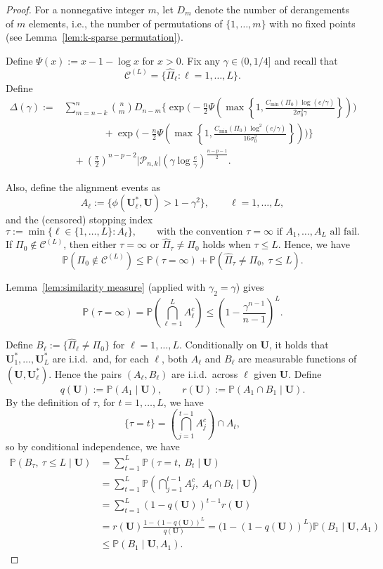 \documentclass[11pt, reqno]{amsart}
\newcommand{\bP}{\mathbb{P}}
\renewcommand{\hat}{\widehat}
\renewcommand{\le}{\leqslant}
\newcommand{\mC}{\mathcal{C}}
\newcommand{\mP}{\mathcal{P}}
\newcommand{\1}{\mbox{1}\hspace{-0.25em}\mbox{l}}
\theoremstyle{definition}\newtheorem{problem}{Problem}[section]
\theoremstyle{definition}\newtheorem{definition}[problem]{Definition}
\theoremstyle{remark}\newtheorem{assumption}{Assumption}
\theoremstyle{remark}\newtheorem{remark}[problem]{Remark}
\theoremstyle{definition}\newtheorem{example}[problem]{Example}
\theoremstyle{plain}\newtheorem{theorem}[problem]{Theorem}
\theoremstyle{plain}\newtheorem{question}[problem]{Question}
\theoremstyle{plain}\newtheorem{lemma}[problem]{Lemma}
\theoremstyle{plain}\newtheorem{proposition}[problem]{Proposition}
\theoremstyle{plain}\newtheorem{corollary}[problem]{Corollary}
\theoremstyle{plain}\newtheorem{conjecture}[problem]{Conjecture}
\begin{document}
\begin{proof}
For a nonnegative integer $m$, let $D_m$ denote the number of derangements of $m$ elements, i.e.,
the number of permutations of $\{1,\dots,m\}$ with no fixed points (see Lemma~\ref{lem:k-sparse permutation}).

Define $\Psi(x):=x-1-\log x$ for $x>0$. Fix any $\gamma\in(0,1/4]$ and recall that
\[
\mC^{(L)}=\{\hat\Pi_\ell:\ell=1,\dots,L\}.
\]
Define
\begin{align}
\label{eq:Delta-gamma}
\Delta(\gamma)
:=
&\sum_{m=n-k}^n\binom{n}{m}D_{n-m}
\Bigg\{
\exp\Bigg(
-\frac{n}{2}\Psi\left(
\max\left\{1,
\frac{C_{\min}(\Pi_0)\log(e/\gamma)}{2\sigma_0^2\gamma}
\right\}
\right)
\Bigg)
\nonumber\\
&\qquad\qquad+
\exp\Bigg(
-\frac{n}{2}\Psi\left(
\max\left\{1,
\frac{C_{\min}(\Pi_0)\log^2(e/\gamma)}{16\sigma_0^2}
\right\}
\right)
\Bigg)
\Bigg\}
\nonumber\\
&\quad+
\left(\frac{\pi}{2}\right)^{n-p-2}\lvert\mP_{n,k}\rvert
\left(\gamma\log\frac{e}{\gamma}\right)^{\frac{n-p-1}{2}}.
\end{align}

Also, define the alignment events as
\[
A_\ell := \{\phi(\bm U_\ell^*,\bm U)>1-\gamma^2\},
\qquad \ell=1,\dots,L,
\]
and the (censored) stopping index
\[
\tau := \min\{\ell\in\{1,\dots,L\}: A_\ell\},
\qquad \text{with the convention }\tau=\infty \text{ if }A_1,\dots,A_L\text{ all fail.}
\]
If $\Pi_0\notin\mC^{(L)}$, then either $\tau=\infty$ or $\hat\Pi_\tau\neq\Pi_0$ holds when $\tau\le L$. Hence, we have
\begin{equation}\label{eq:recovery-split}
\bP(\Pi_0\notin\mC^{(L)})
\le \bP(\tau=\infty)+\bP(\hat\Pi_\tau\neq\Pi_0,\ \tau\le L).
\end{equation}

Lemma~\ref{lem:similarity measure} (applied with $\gamma_2=\gamma$) gives
\[
\bP(\tau=\infty)
=\bP\left(\bigcap_{\ell=1}^L A_\ell^c\right)
\le \left(1-\frac{\gamma^{n-1}}{n-1}\right)^L.
\]

Define $B_\ell := \{\hat\Pi_\ell\neq \Pi_0\}$ for $\ell=1,\dots,L$.
Conditionally on $\bm U$, it holds that $\bm U_1^*,\dots,\bm U_L^*$ are i.i.d.\ and, for each $\ell$,
both $A_\ell$ and $B_\ell$ are measurable functions of $(\bm U,\bm U_\ell^*)$.
Hence the pairs $(A_\ell,B_\ell)$ are i.i.d.\ across $\ell$ given $\bm U$.
Define
\[
q(\bm U):=\bP(A_1\mid \bm U),\qquad r(\bm U):=\bP(A_1\cap B_1\mid \bm U).
\]
By the definition of $\tau$, for $t=1,\dots,L$, we have
\[
\{\tau=t\}=\left(\bigcap_{j=1}^{t-1}A_j^c\right)\cap A_t,
\]
so by conditional independence, we have
\begin{align*}
\bP(B_\tau,\ \tau\le L\mid \bm U)
&=\sum_{t=1}^L \bP(\tau=t,\ B_t\mid \bm U)\\
&=\sum_{t=1}^L \bP\left(\bigcap_{j=1}^{t-1}A_j^c,\ A_t\cap B_t\mid \bm U\right)\\
&=\sum_{t=1}^L (1-q(\bm U))^{t-1} r(\bm U)\\
&= r(\bm U)\frac{1-(1-q(\bm U))^L}{q(\bm U)}
= \bigl(1-(1-q(\bm U))^L\bigr)\bP(B_1\mid \bm U, A_1)\\
&\le \bP(B_1\mid \bm U, A_1).
\end{align*}


\end{proof}
\end{document}
